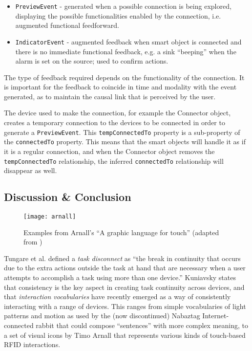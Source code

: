 \begin{itemize}
\item \texttt{PreviewEvent} - generated when a possible connection is being explored, displaying the possible functionalities enabled by the connection, i.e. augmented functional feedforward.
\item \texttt{IndicatorEvent} - augmented feedback when smart object is connected and there is no immediate functional feedback, e.g. a sink ``beeping'' when the alarm is set on the source; used to confirm actions.   
\end{itemize} 

The type of feedback required depends on the functionality of the connection. It is important for the feedback to coincide in time and modality with the event generated, as to maintain the causal link that is perceived by the user.

The device used to make the connection, for example the Connector object, creates a temporary connection to the devices to be connected in order to generate a \texttt{PreviewEvent}. This \texttt{tempConnectedTo} property is a sub-property of the \texttt{connectedTo} property. This means that the smart objects will handle it as if it is a regular connection, and when the Connector object removes the \texttt{tempConnectedTo} relationship, the inferred \texttt{connectedTo} relationship will disappear as well.


\subsection{Discussion \& Conclusion}

\begin{figure}[bth]
	\begin{center}
        \texttt{[image: arnall]}
	\end{center}
        \caption{Examples from Arnall's ``A graphic language for touch'' (adapted from \cite{Arnall2006})}
        \label{arnall}
\end{figure}

Tungare et al. \cite{Tungare2007} defined a \emph{task disconnect} as ``the break in continuity that occurs due to the extra actions outside the task at hand that are necessary when a user attempts to accomplish a task using more than one device.'' Kuniavsky \cite{Kuniavsky} states that consistency is the key aspect in creating task continuity across devices, and that \emph{interaction vocabularies} have recently emerged as a way of consistently interacting with a range of devices. This ranges from simple vocabularies of light patterns and motion as used by the (now discontinued) Nabaztag Internet-connected rabbit that could compose ``sentences'' with more complex meaning, to a set of visual icons by Timo Arnall \cite{Arnall2006} that represents various kinds of touch-based RFID interactions.

